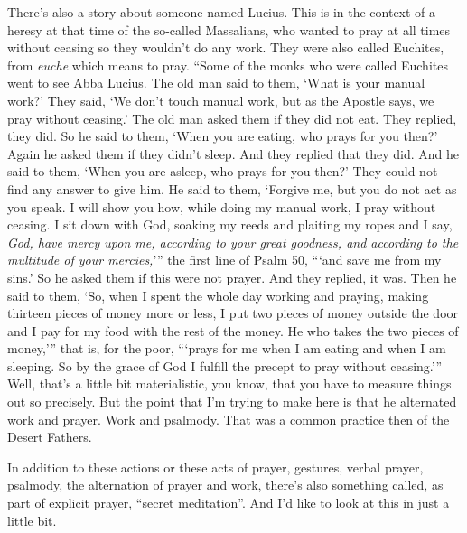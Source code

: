 There's also a story about someone named Lucius. This is in the context of a heresy at that time of the so-called Massalians, who wanted to pray at all times without ceasing so they wouldn't do any work. They were also called Euchites, from \emph{euche} which means to pray. ``Some of the monks who were called Euchites went to see Abba Lucius. The old man said to them, `What is your manual work?' They said, `We don't touch manual work, but as the Apostle says, we pray without ceasing.' The old man asked them if they did not eat. They replied, they did. So he said to them, `When you are eating, who prays for you then?' Again he asked them if they didn't sleep. And they replied that they did. And he said to them, `When you are asleep, who prays for you then?' They could not find any answer to give him. He said to them, `Forgive me, but you do not act as you speak. I will show you how, while doing my manual work, I pray without ceasing. I sit down with God, soaking my reeds and plaiting my ropes and I say, \emph{God, have mercy upon me, according to your great goodness, and according to the multitude of your mercies,}''' the first line of Psalm 50, ```and save me from my sins.' So he asked them if this were not prayer. And they replied, it was. Then he said to them, `So, when I spent the whole day working and praying, making thirteen pieces of money more or less, I put two pieces of money outside the door and I pay for my food with the rest of the money. He who takes the two pieces of money,''' that is, for the poor, ```prays for me when I am eating and when I am sleeping. So by the grace of God I fulfill the precept to pray without ceasing.''' Well, that's a little bit materialistic, you know, that you have to measure things out so precisely. But the point that I'm trying to make here is that he alternated work and prayer. Work and psalmody. That was a common practice then of the Desert Fathers.

In addition to these actions or these acts of prayer, gestures, verbal prayer, psalmody, the alternation of prayer and work, there's also something called, as part of explicit prayer, ``secret meditation''. And I'd like to look at this in just a little bit.

